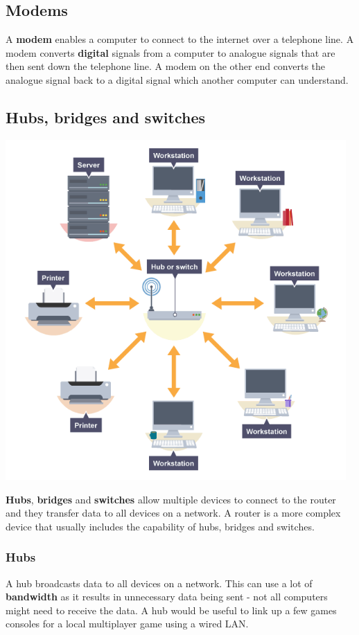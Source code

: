 \documentclass[a4paper,12pt]{article}
\begin{document}
\subsection{Modems}
A \textbf{modem} enables a computer to connect to the internet over a telephone line. A modem converts \textbf{digital} signals from a computer to analogue signals that are then sent down the telephone line. A modem on the other end converts the analogue signal back to a digital signal which another computer can understand.

\subsection{Hubs, bridges and switches}

\includegraphics[width=13cm]{./hbs.PNG}

\textbf{Hubs}, \textbf{bridges} and \textbf{switches} allow multiple devices to connect to the router and they transfer data to all devices on a network. A router is a more complex device that usually includes the capability of hubs, bridges and switches.

\subsubsection{Hubs}
A hub broadcasts data to all devices on a network. This can use a lot of \textbf{bandwidth} as it results in unnecessary data being sent - not all computers might need to receive the data. A hub would be useful to link up a few games consoles for a local multiplayer game using a wired LAN.
\end{document}
